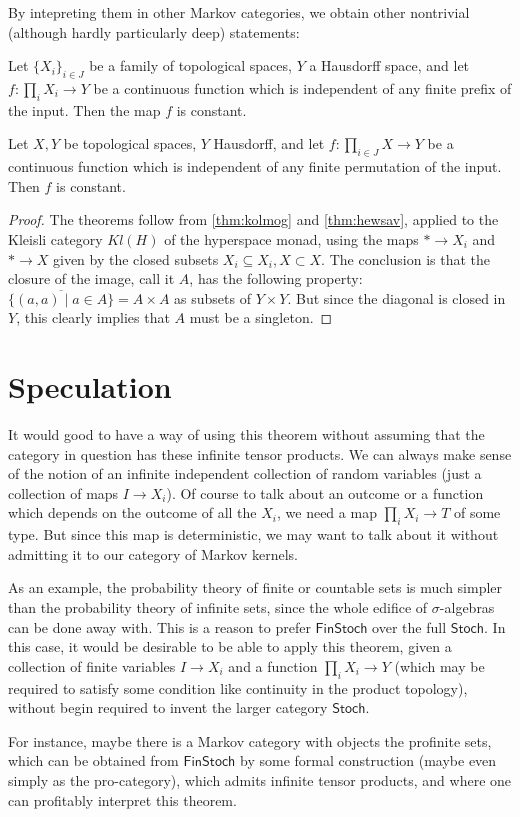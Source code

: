 \documentclass[11pt]{article}
\renewcommand{\sf}{\mathsf}
\begin{document}
By intepreting them in other Markov categories, we obtain other nontrivial (although hardly particularly deep) statements:

\begin{corollary}
    Let $\{X_i\}_{i \in J}$ be a family of topological spaces, $Y$ a Hausdorff space, and let $f: \prod_i X_i \to Y$ be a continuous function
    which is independent of any finite prefix of the input.
    Then the map $f$ is constant.
\end{corollary}
\begin{corollary}
    Let $X, Y$ be topological spaces, $Y$ Hausdorff, and let $f: \prod_{i\in J} X \to Y$ be a continuous function which is independent of any finite permutation of the input.
    Then $f$ is constant.
\end{corollary}
\begin{proof}
    The theorems follow from \cref{thm:kolmog} and \cref{thm:hewsav}, applied to the Kleisli category $Kl(H)$ of the hyperspace monad,
    using the maps $* \to X_i$ and $* \to X$ given by the closed subsets $X_i \subseteq X_i, X \subset X$.
    The conclusion is that the closure of the image, call it $A$, has the following property: $\overline{\{(a,a) \mid a \in A\}} = A \times A$ as subsets of $Y \times Y$.
    But since the diagonal is closed in $Y$, this clearly implies that $A$ must be a singleton.
\end{proof}


\section{Speculation}
It would good to have a way of using this theorem without assuming that the category in question has these infinite tensor products.
We can always make sense of the notion of an infinite independent collection of random variables (just a collection of maps $I \to X_i$).
Of course to talk about an outcome or a function which depends on the outcome of all the $X_i$, we need a map $\prod_i X_i \to T$ of some type.
But since this map is deterministic, we may want to talk about it without admitting it to our category of Markov kernels.

As an example, the probability theory of finite or countable sets is much simpler than the probability theory of infinite sets, since the whole edifice of $\sigma$-algebras can be done away with.
This is a reason to prefer $\sf{FinStoch}$ over the full $\sf{Stoch}$.
In this case, it would be desirable to be able to apply this theorem, given a collection of finite variables $I \to X_i$ and a function $\prod_i X_i \to Y$
(which may be required to satisfy some condition like continuity in the product topology), without begin required to invent the larger category $\sf{Stoch}$.

For instance, maybe there is a Markov category with objects the profinite sets, which can be obtained from $\sf{FinStoch}$ by some formal construction (maybe even simply as the pro-category), which admits infinite tensor products, and where one can profitably interpret this theorem.




\end{document}
